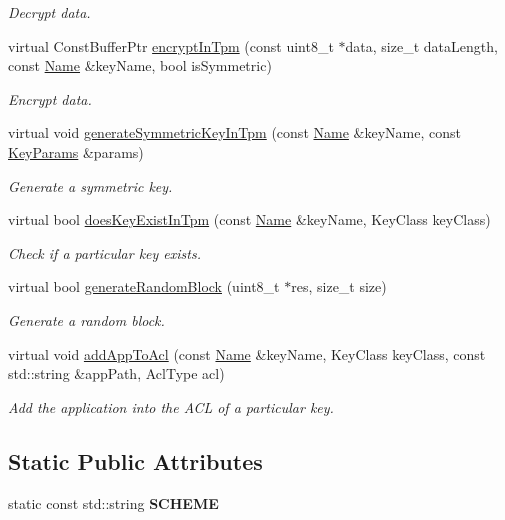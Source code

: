 \begin{DoxyCompactItemize}
\begin{DoxyCompactList}\small\item\em Decrypt data. \end{DoxyCompactList}\item 
virtual Const\+Buffer\+Ptr \hyperlink{classndn_1_1SecTpmFile_ab717c28f93aa7a6a003dcbd2f39638f6}{encrypt\+In\+Tpm} (const uint8\+\_\+t $\ast$data, size\+\_\+t data\+Length, const \hyperlink{classndn_1_1Name}{Name} \&key\+Name, bool is\+Symmetric)
\begin{DoxyCompactList}\small\item\em Encrypt data. \end{DoxyCompactList}\item 
virtual void \hyperlink{classndn_1_1SecTpmFile_ad18aa031e28e71d5e0040888d0d6664c}{generate\+Symmetric\+Key\+In\+Tpm} (const \hyperlink{classndn_1_1Name}{Name} \&key\+Name, const \hyperlink{classndn_1_1KeyParams}{Key\+Params} \&params)
\begin{DoxyCompactList}\small\item\em Generate a symmetric key. \end{DoxyCompactList}\item 
virtual bool \hyperlink{classndn_1_1SecTpmFile_a61c4a0335d537390bef85477499898e5}{does\+Key\+Exist\+In\+Tpm} (const \hyperlink{classndn_1_1Name}{Name} \&key\+Name, Key\+Class key\+Class)
\begin{DoxyCompactList}\small\item\em Check if a particular key exists. \end{DoxyCompactList}\item 
virtual bool \hyperlink{classndn_1_1SecTpmFile_a0b47b1652cb625fa8d99df20376e8109}{generate\+Random\+Block} (uint8\+\_\+t $\ast$res, size\+\_\+t size)
\begin{DoxyCompactList}\small\item\em Generate a random block. \end{DoxyCompactList}\item 
virtual void \hyperlink{classndn_1_1SecTpmFile_a975872b6f424c74a052e752ad005ca1e}{add\+App\+To\+Acl} (const \hyperlink{classndn_1_1Name}{Name} \&key\+Name, Key\+Class key\+Class, const std\+::string \&app\+Path, Acl\+Type acl)
\begin{DoxyCompactList}\small\item\em Add the application into the A\+CL of a particular key. \end{DoxyCompactList}\end{DoxyCompactItemize}
\subsection*{Static Public Attributes}
\begin{DoxyCompactItemize}
\item 
static const std\+::string {\bfseries S\+C\+H\+E\+ME}\hypertarget{classndn_1_1SecTpmFile_af0303378f7e8fde3b7775614acb3c800}{}\label{classndn_1_1SecTpmFile_af0303378f7e8fde3b7775614acb3c800}

\end{DoxyCompactItemize}
